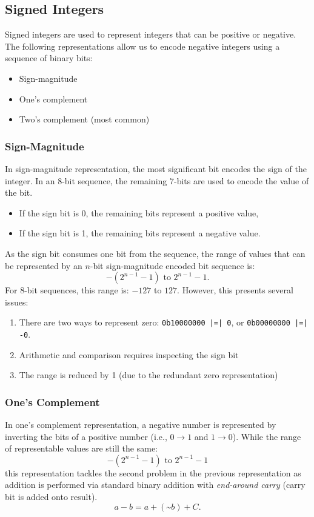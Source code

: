 \documentclass{article}
\begin{document}
\subsection{Signed Integers}
Signed integers are used to represent integers that can be positive or
negative. The following representations allow us to encode negative
integers using a sequence of binary bits:
\begin{itemize}
    \item Sign-magnitude
    \item One's complement
    \item Two's complement (most common)
\end{itemize}
\subsubsection{Sign-Magnitude}
In sign-magnitude representation, the most significant bit encodes the
sign of the integer. In an 8-bit sequence, the remaining 7-bits are
used to encode the value of the bit.
\begin{itemize}
    \item If the sign bit is 0, the remaining bits represent a positive
          value,
    \item If the sign bit is 1, the remaining bits represent a negative
          value.
\end{itemize}
As the sign bit consumes one bit from the sequence, the range of values that can be
represented by an \(n\)-bit sign-magnitude encoded bit sequence is:
\begin{equation*}
    -\left( 2^{n - 1} - 1 \right) \text{ to } 2^{n - 1} - 1.
\end{equation*}
For 8-bit sequences, this range is: \(-127\) to \(127\).
However, this presents several issues:
\begin{enumerate}
    \item There are two ways to represent zero:
          \texttt{0b10000000 |=| 0}, or
          \texttt{0b00000000 |=| -0}.
    \item Arithmetic and comparison requires inspecting the sign bit
    \item The range is reduced by 1 (due to the redundant zero
          representation)
\end{enumerate}
\subsubsection{One's Complement}
In one's complement representation, a negative number is represented by
inverting the bits of a positive number (i.e., \(0 \to 1\) and \(1 \to
0\)). While the range of representable values are still the same:
\begin{equation*}
    -\left( 2^{n - 1} - 1 \right) \text{ to } 2^{n - 1} - 1
\end{equation*}
this representation tackles the second problem in the previous representation as
addition is performed via standard binary addition with \textit{end-around carry} (carry bit is added onto result).
\begin{equation*}
    a - b = a + \left( \text{\textasciitilde} b \right) + C.
\end{equation*}
\end{document}
